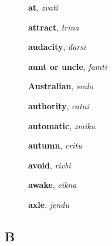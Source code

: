 \documentclass[12pt]{book}
\begin{document}
\begin{description}
\item[ ] \textbf{at}, \textit{zvati}

\item[ ] \textbf{attract}, \textit{trina}

\item[ ] \textbf{audacity}, \textit{darsi}

\item[ ] \textbf{aunt or uncle}, \textit{famti}

\item[ ] \textbf{Australian}, \textit{sralo}

\item[ ] \textbf{authority}, \textit{catni}

\item[ ] \textbf{automatic}, \textit{zmiku}

\item[ ] \textbf{autumn}, \textit{critu}

\item[ ] \textbf{avoid}, \textit{rivbi}

\item[ ] \textbf{awake}, \textit{cikna}

\item[ ] \textbf{axle}, \textit{jendu}



\end{description}



\subsection{B} %
\end{document}
